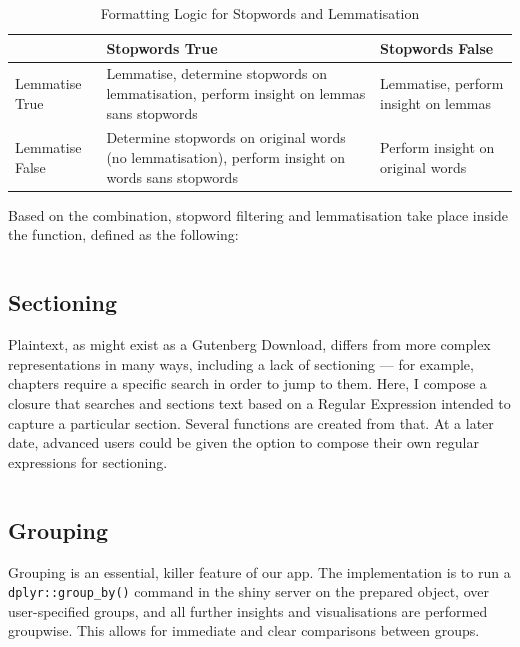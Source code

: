 \documentclass[11pt, a4paper, oneside]{report}
\begin{document}
\begin{table}[h]
  \centering
  \begin{tabular}{p{20mm}|p{50mm}p{50mm}}
  & Stopwords True & Stopwords False\\
  \toprule
Lemmatise True & Lemmatise, determine stopwords on lemmatisation, perform insight on lemmas sans stopwords & Lemmatise, perform insight on lemmas\\
Lemmatise False & Determine stopwords on original words (no lemmatisation), perform insight on words sans stopwords & Perform insight on original words\\
\end{tabular}
\caption{Formatting Logic for Stopwords and Lemmatisation}\label{tab:formatting}
\end{table}

Based on the combination, stopword filtering and lemmatisation take
place inside the function, defined as the following:

\inputminted[frame=lines,fontsize=\scriptsize,xleftmargin=\parindent,linenos]{R}{R/format-data.R}

\subsection{Sectioning}

Plaintext, as might exist as a Gutenberg Download, differs from more
complex representations in many ways, including a lack of sectioning
--- for example, chapters require a specific search in order to jump
to them. Here, I compose a closure that searches and sections text
based on a Regular Expression intended to capture a particular
section. Several functions are created from that. At a later date,
advanced users could be given the option to compose their own regular
expressions for sectioning.

\inputminted[frame=lines,fontsize=\scriptsize,xleftmargin=\parindent,linenos]{R}{R/section.R}

\subsection{Grouping}

Grouping is an essential, killer feature of our app. The
implementation is to run a \texttt{dplyr::group_by()} command
in the shiny server on the prepared object, over user-specified
groups, and all further insights and visualisations are performed
groupwise. This allows for immediate and clear comparisons between
groups.
\end{document}
